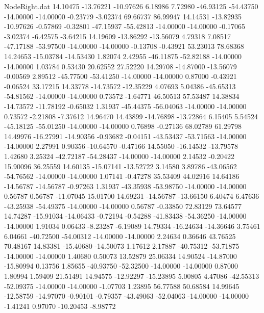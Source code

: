 \begin{filecontents}{NodeRight.dat}
  14.10475  -13.76221  -10.97626     6.18986    7.72980  -46.93125  -54.43750  -14.00000  -14.00000   -0.23779   -3.02374   69.66737   86.99947
  14.14531  -13.82935  -10.97626    -0.57869   -0.32801  -47.15937  -55.42813  -14.00000  -14.00000   -0.17065   -3.02374   -6.42575   -3.64215
  14.19609  -13.86292  -13.56079     4.79318    7.08517  -47.17188  -53.97500  -14.00000  -14.00000   -0.13708   -0.43921   53.23013   78.68368
  14.24653  -15.03784  -14.53430     1.82074    2.42955  -46.11875  -52.82188  -14.00000  -14.00000    1.03784    0.53430   20.62552   27.52220
  14.29708  -14.87000  -13.56079    -0.00569    2.89512  -45.77500  -53.41250  -14.00000  -14.00000    0.87000   -0.43921   -0.06524   33.17215
  14.33778  -14.73572  -12.35229     4.07693    5.04386  -45.65313  -54.81562  -14.00000  -14.00000    0.73572   -1.64771   46.50513   57.53487
  14.38834  -14.73572  -11.78192    -0.65032    1.31937  -45.44375  -56.04063  -14.00000  -14.00000    0.73572   -2.21808   -7.37612   14.96470
  14.43899  -14.76898  -13.72864     6.15405    5.54524  -45.18125  -55.01250  -14.00000  -14.00000    0.76898   -0.27136   68.02789   61.29798
  14.49976  -16.27991  -14.90356    -0.93682   -0.04151  -43.53437  -53.71563  -14.00000  -14.00000    2.27991    0.90356  -10.64570   -0.47166
  14.55050  -16.14532  -13.79578     1.42680    3.25324  -42.72187  -54.28437  -14.00000  -14.00000    2.14532   -0.20422   15.90096   36.25559
  14.60135  -15.07141  -13.52722     3.14580    3.89786  -43.06562  -54.76562  -14.00000  -14.00000    1.07141   -0.47278   35.53409   44.02916
  14.64186  -14.56787  -14.56787    -0.97263    1.31937  -43.35938  -53.98750  -14.00000  -14.00000    0.56787    0.56787  -11.07045   15.01700
  14.69231  -14.56787  -13.66150     6.40474    6.47636  -43.25938  -54.49375  -14.00000  -14.00000    0.56787   -0.33850   72.83129   73.64577
  14.74287  -15.91034  -14.06433    -0.72194   -0.54288  -41.83438  -54.36250  -14.00000  -14.00000    1.91034    0.06433   -8.23287   -6.19089
  14.79334  -16.24634  -14.36646     3.75461    6.04661  -40.72500  -54.00312  -14.00000  -14.00000    2.24634    0.36646   43.76525   70.48167
  14.83381  -15.40680  -14.50073     1.17612    2.17887  -40.75312  -53.71875  -14.00000  -14.00000    1.40680    0.50073   13.52879   25.06334
  14.90524  -14.87000  -15.80994     0.13756    1.85655  -40.93750  -52.32500  -14.00000  -14.00000    0.87000    1.80994    1.59409   21.51491
  14.94575  -12.92297  -15.23895     5.00805    4.47086  -42.55313  -52.09375  -14.00000  -14.00000   -1.07703    1.23895   56.77588   50.68584
  14.99645  -12.58759  -14.97070    -0.90101   -0.79357  -43.49063  -52.04063  -14.00000  -14.00000   -1.41241    0.97070  -10.20453   -8.98772

\end{filecontents}
